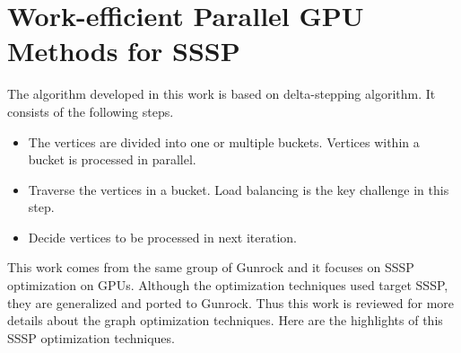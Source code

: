 \section{Work-efficient Parallel GPU Methods for SSSP}
The algorithm developed in this work \cite{Davidson2014work-efficient} is based
on delta-stepping algorithm. It consists of the following steps.
\begin{itemize}
    \item The vertices are divided into one or multiple buckets. Vertices within
        a bucket is processed in parallel.
    \item Traverse the vertices in a bucket. Load balancing is the key challenge
        in this step.
    \item Decide vertices to be processed in next iteration.
\end{itemize}

This work comes from the same group of Gunrock and it focuses on SSSP
optimization on GPUs. Although the optimization techniques used target
SSSP, they are generalized and ported to Gunrock. Thus this work is reviewed
for more details about the graph optimization techniques. Here are the highlights of
this SSSP optimization techniques.

